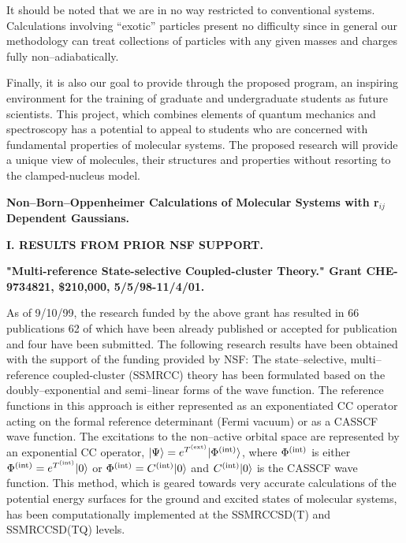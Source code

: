 It should be noted 
that we are in no way restricted to conventional systems.
Calculations involving ``exotic'' particles present no difficulty 
since in general our methodology can treat collections of particles
with any given masses and charges fully non--adiabatically.  
 

Finally, it is also our goal to
provide through the proposed program, an inspiring environment 
for the training of graduate and undergraduate students as
future scientists. This project, which combines elements of 
quantum mechanics and spectroscopy has a potential to appeal
to students who are 
concerned with 
fundamental properties of molecular systems.
The proposed research will provide a unique view of molecules,
their structures and properties without resorting to
the clamped-nucleus model.


\newpage



\setcounter{page}{1}

\begin{center}
{\Large \bf 
Non--Born--Oppenheimer Calculations of
Molecular Systems with r$_{ij}$ Dependent Gaussians.}

\end{center}


\vspace{2mm}

\noindent
{\bf I. RESULTS FROM PRIOR NSF SUPPORT.}


\noindent
{\bf "Multi-reference State-selective Coupled-cluster Theory."
Grant CHE-9734821, \$210,000, 5/5/98-11/4/01.} 

\vspace{3mm}

As of 9/10/99, the research funded by the above 
grant has resulted in 66 publications
\cite{A1,A2,A3,A4,A5,A6,A7,A8,%
A9,A10,A11,A12,A13,A14,A15,%
A16,A17,A18,%
A19,A20,A21,A22,A23,A24,A25,%
A26,A27,A28,A29,A30,A31,A32,A33,A34,%
A35,A36,A37,%
A38,A381,A382,%
A383,A384,A385,A3851,%
A3860,%
A3861,A3862,A3863,A3864,A3865,%
A3866,A3867,A3868,A3869,A3870,A3871,%
A3872,A3873,A3874,A3875,%
A3876,A3877,A3878,A3879,A3880,A3881}  
62 of which
have been already published or accepted for 
publication and four have been submitted.
The following research
results have been obtained with the support 
of the funding provided by NSF:
The state--selective, multi--reference coupled-cluster  
(SSMRCC) theory has been formulated based
on the doubly--exponential and semi--linear forms 
of the wave function.
The reference functions in this approach 
is either represented as 
an exponentiated CC operator  
acting on the formal reference determinant (Fermi vacuum)
or as a CASSCF wave function.
The excitations to the non--active orbital space 
are represented by an exponential CC
operator,
$|\Psi\rangle  = e^{T^{\rm (ext)}} | \Phi^{\rm (int)}
\rangle$, where $\Phi^{\rm (int)}$
is either 
$\Phi^{\rm (int)} = e^{T^{\rm (int)}} |0\rangle$ 
or 
$\Phi^{\rm (int)} = C^{\rm (int)} |0\rangle$ and
$C^{\rm (int)} |0\rangle$ is the CASSCF wave function.
This method,
which is geared towards very accurate calculations of
the potential energy surfaces for the ground and excited 
states of molecular systems,
has been computationally implemented at 
the SSMRCCSD(T) and SSMRCCSD(TQ) levels. 
  

